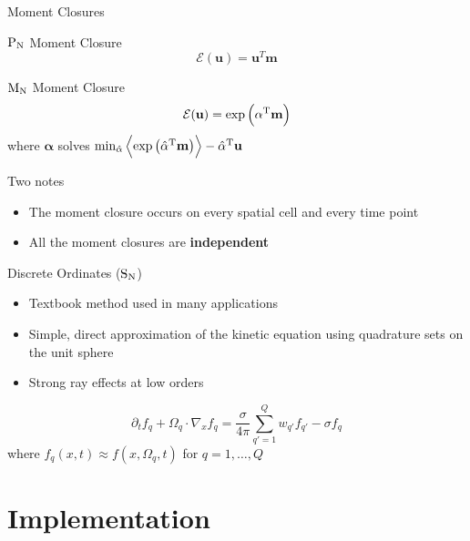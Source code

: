 \documentclass{beamer}
\renewcommand{\vec}[1]{\ensuremath{\mathbf{#1}}}
\newcommand{\integral}[1]{\ensuremath{\left\langle #1 \right\rangle}}
\newcommand{\closure}[1]{\ensuremath{\mathcal{E}(#1)}}
\newcommand{\T}[1]{\ensuremath{#1^\textnormal{T}}}
\newcommand{\SN}{\ensuremath{\textnormal{S}_\textnormal{N}}\xspace}
\newcommand{\PN}{\ensuremath{\textnormal{P}_\textnormal{N}}\xspace}
\newcommand{\MN}{\ensuremath{\textnormal{M}_\textnormal{N}}\xspace}
\begin{document}
    \begin{frame}{Moment Closures}
        \begin{block}{\PN Moment Closure}
            \[ \closure{\vec{u}} = \vec{u}^T \vec{m} \]
        \end{block}
        \begin{block}{\MN Moment Closure}
            \[ \closure{\vec{u}} = \exp\left(\T{\vec{\alpha}} \vec{m}\right) \]
            where \vec{\alpha} solves $\min_{\hat{\alpha}} \integral{\exp\left(\T{\hat{\vec{\alpha}}} \vec{m}\right)} - \T{\hat{\vec{\alpha}}} \vec{u}$
        \end{block}

        \vfill

        \alert{Two notes}
        \begin{itemize}
            \item The moment closure occurs on every spatial cell and every time point
            \item All the moment closures are \textbf{independent}
        \end{itemize}
    \end{frame}

    \begin{frame}{Discrete Ordinates (\SN)}
        \begin{itemize}
            \item Textbook method used in many applications
            \item Simple, direct approximation of the kinetic equation using quadrature sets on the unit sphere
            \item Strong ray effects at low orders
        \end{itemize}

        \vfill

        \begin{equation*}
            \partial_t f_q + \Omega_q \cdot \nabla_x f_q = \frac{\sigma}{4\pi} \sum_{q' = 1}^Q w_{q'} f_{q'} - \sigma f_q
        \end{equation*}
        where $f_q(x,t) \approx f(x,\Omega_q,t)$ for $q = 1, \dots, Q$
    \end{frame}

\section{Implementation}
\end{document}
